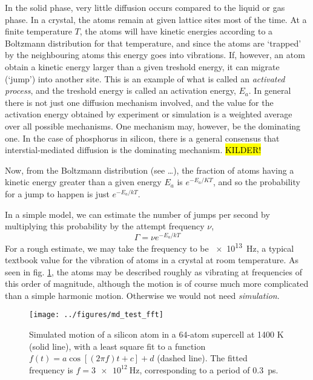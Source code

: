 \documentclass[11pt,bibliography=totoc,index=totoc]{scrbook}   %
\newcommand{\comment}[1]{\hl{#1}}
\begin{document}
In the solid phase, very little diffusion occurs compared to the liquid or gas phase. 
In a crystal, the atoms remain at given lattice sites most of the time.
At a finite temperature $T$, the atoms will have kinetic energies according to a Boltzmann distribution for that temperature,
and since the atoms are `trapped' by the neighbouring atoms this energy goes into vibrations. 
If, however, an atom obtain a kinetic energy larger than a given treshold energy, it can migrate (`jump') into another site.
This is an example of what is called an \emph{activated process}, and the treshold energy is called an activation energy, $E_a$.
In general there is not just one diffusion mechanism involved, and the value for the activation energy obtained by experiment or simulation is a weighted average over all possible mechanisms.
One mechanism may, however, be the dominating one. In the case of phosphorus in silicon, there is a general consensus that interstial-mediated diffusion is the dominating mechanism. \comment{KILDER!}

Now, from the Boltzmann distribution (see \ldots), the fraction of atoms having a kinetic energy greater than a given energy $E_a$ is $e^{-E_a/KT}$, and so the probability for a jump to happen is just $e^{-E_a/kT}$. 

In a simple model, we can estimate the number of jumps per second by multiplying this probability by the attempt frequency $\nu$,
\begin{equation}
  \Gamma = \nu e^{-E_a/kT}
  \label{eq:jump-freq}
\end{equation}
For a rough estimate, we may take the frequency to be \SI{e13}{\hertz}, a typical textbook value for the vibration of atoms in a crystal at room temperature.
As seen in fig. \ref{fig:figures/md_test_fft}, the atoms may be described roughly as vibrating at frequencies of this order of magnitude, although the motion is of course much more complicated than a simple harmonic motion. Otherwise we would not need \emph{simulation}.

\begin{figure}[htbp]
  \begin{center}
    \texttt{[image: ../figures/md\_test\_fft]}
  \end{center}
  \caption{
    Simulated motion of a silicon atom in a 64-atom supercell at 1400 K (solid line), 
    with a least square fit to a function $f(t) = a \cos[(2\pi f)t + c] + d$ (dashed line). 
    The fitted frequency is $f=\SI{3e12}{\hertz}$, corresponding to a period of 0.3~ps.
  }
  \label{fig:figures/md_test_fft}
\end{figure}
\end{document}
